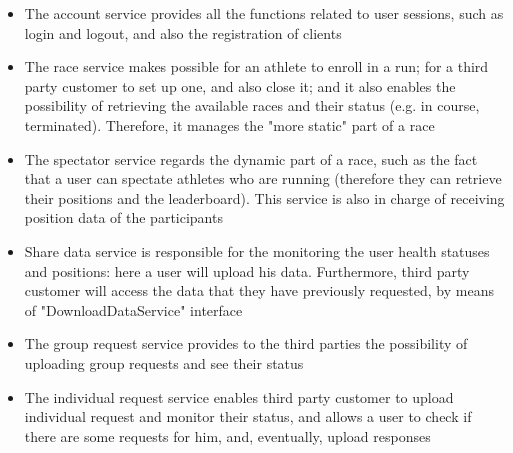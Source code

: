 \begin{itemize}
\item The account service provides all the functions related to user sessions, such as login and logout,
and also the registration of clients 
\item The race service makes possible for an athlete to enroll in a run; for a third party customer to set
up one, and also close it; and it also enables the possibility of retrieving the available races and their
status (e.g. in course, terminated). Therefore, it manages the "more static" part
of a race
\item The spectator service regards the dynamic part of a race, such as the fact that a user can spectate
athletes who are running (therefore they can retrieve their positions and the leaderboard). This
service is also in charge of receiving position data of the participants
\item Share data service is responsible for the monitoring the user health statuses and positions: here a
user will upload his data. Furthermore, third party customer will access the data that they have
previously requested, by means of "DownloadDataService" interface
\item The group request service provides to the third parties the possibility of uploading group requests and see their status 
\item The individual request service enables third party customer to upload individual request and monitor their status, and allows a user to
check if there are some requests for him, and, eventually, upload responses 
\end{itemize}

